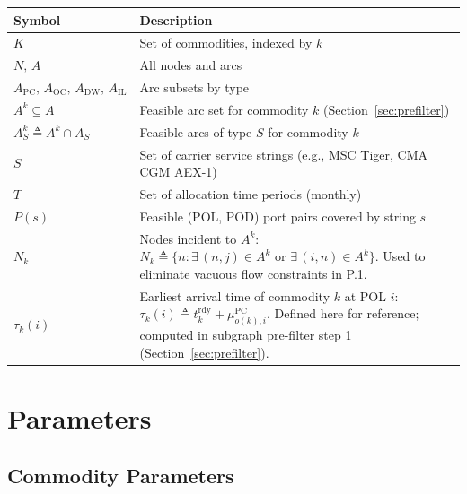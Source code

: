 \documentclass[11pt,a4paper]{article}
\newcommand{\defeq}{\triangleq}
\theoremstyle{definition}
\begin{document}
\begin{center}
\begin{tabular}{lp{11cm}}
\toprule
Symbol & Description \\
\midrule
$K$ & Set of commodities, indexed by $k$ \\
$N,\, A$ & All nodes and arcs \\
$A_{\text{PC}},\, A_{\text{OC}},\, A_{\text{DW}},\, A_{\text{IL}}$ & Arc subsets by type \\
$A^k \subseteq A$ & Feasible arc set for commodity $k$ (Section~\ref{sec:prefilter}) \\
$A^k_S \defeq A^k \cap A_S$ & Feasible arcs of type $S$ for commodity $k$ \\
$S$ & Set of carrier service strings (e.g., MSC Tiger, CMA CGM AEX-1) \\
$T$ & Set of allocation time periods (monthly) \\
$P(s)$ & Feasible (POL, POD) port pairs covered by string $s$ \\
$N_k$ & Nodes incident to $A^k$: $N_k \defeq \{n : \exists\,(n,j) \in A^k \text{ or } \exists\,(i,n) \in A^k\}$. Used to eliminate vacuous flow constraints in P.1. \\
$\tau_k(i)$ & Earliest arrival time of commodity $k$ at POL $i$: $\tau_k(i) \defeq t_k^{\text{rdy}} + \mu_{o(k),i}^{\text{PC}}$. Defined here for reference; computed in subgraph pre-filter step 1 (Section~\ref{sec:prefilter}). \\
\bottomrule
\end{tabular}
\end{center}

\section{Parameters}

\subsection{Commodity Parameters}
\end{document}
